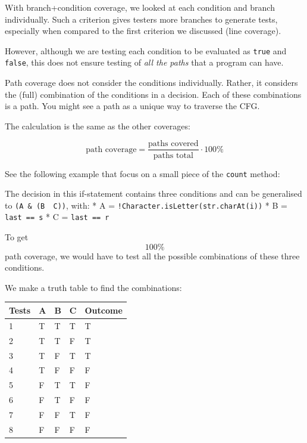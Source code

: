 With branch+condition coverage, we looked at each condition and branch
individually. Such a criterion gives testers more branches to generate
tests, especially when compared to the first criterion we discussed
(line coverage).

However, although we are testing each condition to be evaluated as
\texttt{true} and \texttt{false}, this does not ensure testing of
\emph{all the paths} that a program can have.

Path coverage does not consider the conditions individually. Rather, it
considers the (full) combination of the conditions in a decision. Each
of these combinations is a path. You might see a path as a unique way to
traverse the CFG.

The calculation is the same as the other coverages:

\[\text{path coverage} = \frac{\text{paths covered}}{\text{paths total}} \cdot 100\%\]

See the following example that focus on a small piece of the
\texttt{count} method:

\begin{Shaded}
\begin{Highlighting}[]
\NormalTok{ (!}
\NormalTok{)) \{}
\NormalTok{\}}
\end{Highlighting}
\end{Shaded}

The decision in this if-statement contains three conditions and can be
generalised to \texttt{(A\ \&\ (B\ \textbar{}\ C))}, with: * A =
\texttt{!Character.isLetter(str.charAt(i))} * B =
\texttt{last\ ==\ \textquotesingle{}s\textquotesingle{}} * C =
\texttt{last\ ==\ \textquotesingle{}r\textquotesingle{}}

To get \[100\%\] path coverage, we would have to test all the possible
combinations of these three conditions.

We make a truth table to find the combinations:

\begin{longtable}[]{@{}lllll@{}}
\toprule
Tests & A & B & C & Outcome\tabularnewline
\midrule
\endhead
1 & T & T & T & T\tabularnewline
2 & T & T & F & T\tabularnewline
3 & T & F & T & T\tabularnewline
4 & T & F & F & F\tabularnewline
5 & F & T & T & F\tabularnewline
6 & F & T & F & F\tabularnewline
7 & F & F & T & F\tabularnewline
8 & F & F & F & F\tabularnewline
\bottomrule
\end{longtable}

